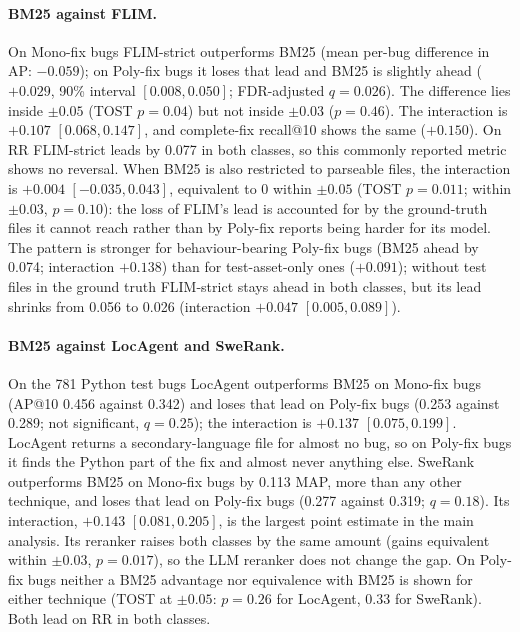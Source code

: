 \documentclass[a4paper,fleqn]{cas-dc}
\begin{document}
\paragraph{BM25 against FLIM.} On Mono-fix bugs FLIM-strict outperforms BM25
(mean per-bug difference in AP: $-0.059$); on Poly-fix bugs it loses that lead and
BM25 is slightly ahead ($+0.029$, 90\% interval $[0.008, 0.050]$; FDR-adjusted
$q=0.026$). The difference lies inside $\pm0.05$ (TOST $p=0.04$) but not
inside $\pm0.03$ ($p=0.46$). The interaction is $+0.107$ $[0.068, 0.147]$, and
complete-fix recall@10 shows the same ($+0.150$). On RR FLIM-strict leads by
0.077 in both classes, so this commonly reported metric shows no reversal.
When BM25 is also restricted to parseable files, the interaction is $+0.004$
$[-0.035, 0.043]$, equivalent to 0 within $\pm0.05$ (TOST $p=0.011$; within
$\pm0.03$, $p=0.10$): the loss of FLIM's lead is accounted for by the
ground-truth files it cannot reach rather than by Poly-fix reports being
harder for its model. The pattern is stronger for behaviour-bearing Poly-fix
bugs (BM25 ahead by 0.074; interaction $+0.138$) than for test-asset-only ones
($+0.091$); without test files
in the ground truth FLIM-strict stays ahead in both classes, but its lead
shrinks from 0.056 to 0.026 (interaction $+0.047$ $[0.005, 0.089]$).

\paragraph{BM25 against LocAgent and SweRank.} On the 781 Python test bugs
LocAgent outperforms BM25 on Mono-fix bugs (AP@10 0.456 against 0.342) and
loses that lead on Poly-fix bugs (0.253 against 0.289; not significant,
$q=0.25$); the interaction is $+0.137$ $[0.075, 0.199]$. LocAgent returns a
secondary-language file for almost no bug, so on Poly-fix bugs it finds the
Python part of the fix and almost never anything else. SweRank outperforms BM25 on Mono-fix
bugs by 0.113 MAP, more than any other technique, and loses that lead on
Poly-fix bugs (0.277 against 0.319; $q=0.18$). Its interaction, $+0.143$
$[0.081, 0.205]$, is the largest point estimate in the main analysis. Its
reranker raises both
classes by the same amount (gains equivalent within $\pm0.03$, $p=0.017$), so
the LLM reranker does not change the gap. On Poly-fix bugs neither a BM25
advantage nor equivalence with BM25 is shown for either technique (TOST at
$\pm0.05$: $p=0.26$ for LocAgent, $0.33$ for SweRank). Both lead on RR in both
classes.
\end{document}
